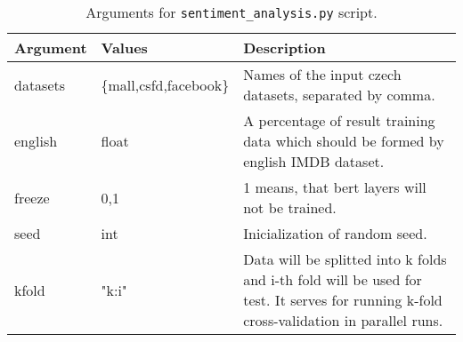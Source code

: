 \begin{table}
\centering
\begin{tabular}{ |p{2cm}|p{}|p{6cm}| } 
 \hline
 Argument & Values & Description \\ 
 \hline \hline
 datasets & \{mall,csfd,facebook\} &  Names of the input czech datasets, separated by comma. \\ \hline
 english & float & A percentage of result training data which should be formed by english IMDB dataset.\\ \hline
 
 freeze & {0,1} & 1 means, that bert layers will not be trained. \\ \hline
 seed & int & Inicialization of random seed. \\ \hline
 kfold & "k:i" & Data will be splitted into k folds and i-th fold will be used for test. It serves for running k-fold cross-validation in parallel runs. \\ \hline
 
 \hline
\end{tabular}
\caption{Arguments for \texttt{sentiment\_analysis.py} script.} 
\label{Tab:sent_args}
\end{table}






